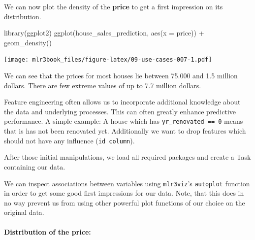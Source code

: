 \documentclass[]{article}
\newenvironment{Shaded}{}{}
\newcommand{\DataTypeTok}[1]{#1}
\newcommand{\KeywordTok}[1]{\textcolor[rgb]{0.00,0.00,1.00}{#1}}
\newcommand{\NormalTok}[1]{#1}
\newcommand{\OperatorTok}[1]{#1}
\newcommand{\StringTok}[1]{\textcolor[rgb]{0.00,0.50,0.50}{#1}}
\let\oldparagraph\paragraph
\renewcommand{\paragraph}[1]{\oldparagraph{#1}\mbox{}}
\renewenvironment{Shaded} {\begin{snugshade}\small} {\end{snugshade}}
\begin{document}
We can now plot the density of the \textbf{price} to get a first impression on its distribution.

\begin{Shaded}
\begin{Highlighting}[]
\KeywordTok{library}\NormalTok{(ggplot2)}
\KeywordTok{ggplot}\NormalTok{(house_sales_prediction, }\KeywordTok{aes}\NormalTok{(}\DataTypeTok{x =}\NormalTok{ price)) }\OperatorTok{+}\StringTok{ }\KeywordTok{geom_density}\NormalTok{()}
\end{Highlighting}
\end{Shaded}

\texttt{[image: mlr3book\_files/figure-latex/09-use-cases-007-1.pdf]}

We can see that the prices for most houses lie between 75.000 and 1.5 million dollars.
There are few extreme values of up to 7.7 million dollars.

Feature engineering often allows us to incorporate additional knowledge about the data and underlying processes.
This can often greatly enhance predictive performance.
A simple example: A house which has \texttt{yr\_renovated\ ==\ 0} means that is has not been renovated yet.
Additionally we want to drop features which should not have any influence (\texttt{id\ column}).

After those initial manipulations, we load all required packages and create a Task containing our data.

\begin{Shaded}
\end{Shaded}

We can inspect associations between variables using \texttt{mlr3viz}'s \texttt{autoplot} function in order to get some good first impressions for our data.
Note, that this does in no way prevent us from using other powerful plot functions of our choice on the original data.

\hypertarget{distribution-of-the-price}{%
\paragraph{Distribution of the price:}\label{distribution-of-the-price}}
\end{document}
